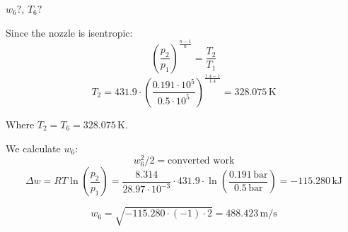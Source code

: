 \( w_6? \), \( T_6? \)  

Since the nozzle is isentropic:  
\[
\left( \frac{p_2}{p_1} \right)^{\frac{n-1}{n}} = \frac{T_2}{T_1}
\]  
\[
T_2 = 431.9 \cdot \left( \frac{0.191 \cdot 10^5}{0.5 \cdot 10^5} \right)^{\frac{1.4-1}{1.4}} = 328.075 \, \text{K}
\]  

Where \( T_2 = T_6 = 328.075 \, \text{K} \).  

We calculate \( w_6 \):  
\[
w_6^2 / 2 = \text{converted work}
\]  
\[
\Delta w = RT \ln \left( \frac{p_2}{p_1} \right) = \frac{8.314}{28.97 \cdot 10^{-3}} \cdot 431.9 \cdot \ln \left( \frac{0.191 \, \text{bar}}{0.5 \, \text{bar}} \right) = -115.280 \, \text{kJ}
\]  

\[
w_6 = \sqrt{-115.280 \cdot (-1) \cdot 2} = 488.423 \, \text{m/s}
\]
